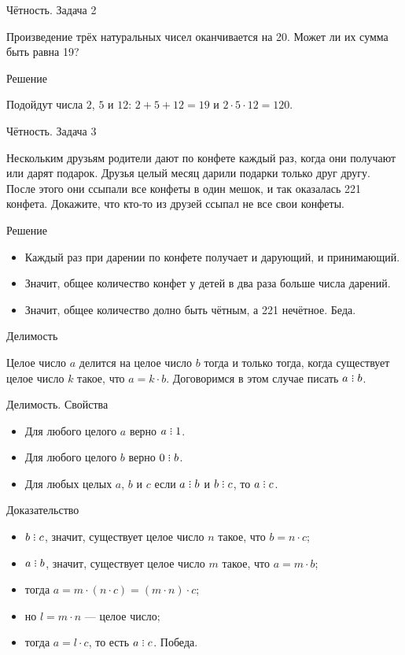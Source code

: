 \documentclass[17pt]{extarticle}
\newcommand{\divsby}{\mathrel{\rlap{.}\rlap{\raisebox{0.55ex}{.}}\raisebox{1.1ex}{.}}}
\newcommand{\newslide}[1]{\newpage \begin{center} \large #1 \end{center}}
\begin{document}
\newslide{Чётность. Задача 2}

Произведение трёх натуральных чисел оканчивается на 20. Может ли их сумма быть равна 19?

\newslide{Решение}

Подойдут числа $2$, $5$ и $12$: $2+5+12 = 19$ и $2\cdot5\cdot12 = 120$.

\newslide{Чётность. Задача 3}

Нескольким друзьям родители дают по конфете каждый раз, когда они получают или дарят подарок. Друзья целый месяц дарили подарки только друг другу. После этого они ссыпали все конфеты в один мешок, и так оказалась 221 конфета. Докажите, что кто-то из друзей ссыпал не все свои конфеты.

\newslide{Решение}

\begin{itemize}
\item Каждый раз при дарении по конфете получает и дарующий, и принимающий.
\item Значит, общее количество конфет у детей в два раза больше числа дарений.
\item Значит, общее количество долно быть чётным, а 221 нечётное. Беда.
\end{itemize}

\newslide{Делимость}

Целое число $a$ делится на целое число $b$ тогда и только тогда, когда существует целое число $k$ такое, что $a = k\cdot b$. Договоримся в этом случае писать $a \divsby b$.

\newslide{Делимость. Свойства}

\begin{itemize}
\item Для любого целого $a$ верно $a \divsby 1$.
\item Для любого целого $b$ верно $0 \divsby b$.
\item Для любых целых $a$, $b$ и $c$ если $a \divsby b$ и $b \divsby c$, то $a \divsby c$.
\end{itemize}

\newslide{Доказательство}\vspace{-7mm}

\begin{itemize}\itemsep=0mm
\item  $b \divsby c$, значит, существует целое число $n$ такое, что $b = n\cdot c$;
\item  $a \divsby b$, значит, существует целое число $m$ такое, что $a = m\cdot b$;
\item тогда $a = m\cdot(n\cdot c) =  (m\cdot n)\cdot c$;
\item но $l = m\cdot n$ --- целое число;
\item тогда $a = l\cdot c$, то есть $a \divsby c$. Победа.
\end{itemize}
\end{document}

